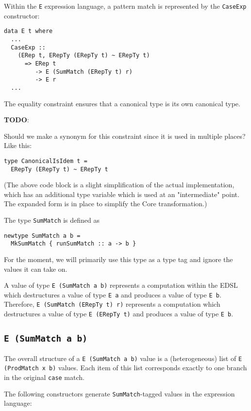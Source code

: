 \documentclass[sigplan,anonymous,review]{acmart}
\newcommand{\ttt}{\texttt}
\newenvironment{todo}
  {\begin{tcolorbox}
   \textbf{TODO}:
  }
  {\end{tcolorbox}
  }
\begin{document}
Within the \ttt{E} expression language, a pattern match is represented by the
\ttt{CaseExp} constructor:

\begin{lstlisting}
data E t where
  ...
  CaseExp ::
    (ERep t, ERepTy (ERepTy t) ~ ERepTy t)
      => ERep t
         -> E (SumMatch (ERepTy t) r)
         -> E r
  ...
\end{lstlisting}

The equality constraint ensures that a canonical type is its own canonical type.

\begin{todo}
  Should we make a synonym for this constraint since it is used in
multiple places? Like this:
\begin{lstlisting}
type CanonicalIsIdem t =
  ERepTy (ERepTy t) ~ ERepTy t
\end{lstlisting}
\end{todo}

(The above code block is a slight simplification of the actual implementation,
which has an additional type variable which is used at an "intermediate" point.
The expanded form is in place to simplify the Core transformation.)

The type \ttt{SumMatch} is defined as

\begin{lstlisting}
newtype SumMatch a b =
  MkSumMatch { runSumMatch :: a -> b }
\end{lstlisting}

For the moment, we will primarily use this type as a type tag and ignore
the values it can take on.

A value of type \ttt{E (SumMatch a b)} represents a computation within the EDSL
which destructures a value of type \ttt{E a} and produces a value of type \ttt{E b}.
Therefore, \ttt{E (SumMatch (ERepTy t) r)} represents a computation which destructures
a value of type \ttt{E (ERepTy t)} and produces a value of type \ttt{E b}.



\subsection{\ttt{E (SumMatch a b)}}

The overall structure of a \ttt{E (SumMatch a b)} value is a (heterogeneous)
list of \ttt{E (ProdMatch x b)} values.  Each item of this list corresponds
exactly to one branch in the original \ttt{case} match.

The following constructors generate \ttt{SumMatch}-tagged values in the
expression language:
\end{document}
